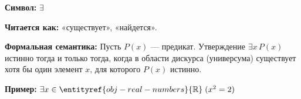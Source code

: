
\hypertarget{term-exists}{}
\hypertarget{term-exists}{}
\begin{object} %

\textbf{Символ:} $\exists$

\textbf{Читается как:} «существует», «найдется».

\textbf{Формальная семантика:}
Пусть $P(x)$ — предикат. Утверждение $\exists x\, P(x)$ истинно тогда и только тогда,
когда в области дискурса (универсума) существует хотя бы один элемент $x$, для которого $P(x)$ истинно.

\textbf{Пример:} $\exists x \in \entityref{obj-real-numbers}{\mathbb{R}}\; (x^2 = 2)$
\end{object}